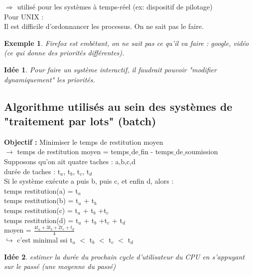 \documentclass[12pt,a4paper]{report}
\newtheorem*{ex}{Exemple}
\newtheorem*{id}{Idée}
\begin{document}
$\Rightarrow$ utilisé pour les systèmes à temps-réel (ex: dispositif de pilotage)\\

Pour UNIX : \\
Il est difficile d'ordonnancer les processus. On ne sait pas le faire.\\
\begin{ex}Firefox est embêtant, on ne sait pas ce qu'il va faire : google, vidéo (ce qui donne des priorités différentes).\end{ex}

\begin{id} Pour faire un système interactif, il faudrait pouvoir "modifier dynamiquement" les priorités.\end{id}

\subsection{Algorithme utilisés au sein des systèmes de "traitement par lots" (batch)}
\textbf{Objectif :} Minimiser le temps de restitution moyen\\
$\rightarrow$ temps de restitution moyen = temps$\_$de$\_$fin - temps$\_$de$\_$soumission\\

Supposons qu'on ait quatre taches : a,b,c,d\\
durée de taches : t$_a$, t$_b$, t$_c$, t$_d$\\
Si le système exécute a puis b, puis c, et enfin d, alors : \\
\hspace*{1cm} temps restitution(a) = t$_a$\\
\hspace*{1cm} temps restitution(b) = t$_a$ + t$_b$\\
\hspace*{1cm} temps restitution(c) = t$_a$ + t$_b$ +t$_c$\\
\hspace*{1cm} temps restitution(d) = t$_a$ + t$_b$ +t$_c$ + t$_d$\\
\hspace*{2cm} moyen = $\frac{4t_a + 3t_b + 2t_c + t_d}{4}$\\
\hspace*{2.5cm} $\hookrightarrow$ c'est minimal ssi t$_a$ $<$ t$_b$ $<$ t$_c$ $<$ t$_d$\\

\begin{id}estimer la durée du prochain cycle d'utilisateur du CPU en s'appuyant sur le passé (une moyenne du passé)\end{id}
\end{document}

